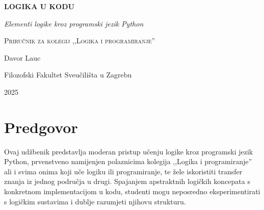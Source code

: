 \documentclass[11pt,a4paper,twoside,openright]{book}
\theoremstyle{definition}
\theoremstyle{plain}
\theoremstyle{remark}
\begin{document}
\frontmatter

\begin{titlepage}
    \centering
    \vspace*{2cm}
    
    {\Huge\bfseries\color{pythonblue} LOGIKA U KODU\par}
    \vspace{1cm}
    {\Large\itshape Elementi logike kroz programski jezik Python\par}
    
    \vspace{3cm}
    
    
    \vspace{3cm}
    
    {\large\scshape Priručnik za kolegij ,,Logika i programiranje''\par}
    \vspace{1cm}
    {\large Davor Lauc\par}
    
    \vfill
    
    {\large Filozofski Fakultet Sveučilišta u Zagrebu\par}
    {\large 2025\par}
\end{titlepage}

\tableofcontents

\chapter*{Predgovor}

Ovaj udžbenik predstavlja moderan pristup učenju logike kroz programski jezik Python, prvenstveno namijenjen polaznicima kolegija ,,Logika i programiranje'' ali i svima onima koji uče logiku ili programiranje, te žele iskoristiti transfer znanja iz jednog područja u drugi.
Spajanjem apstraktnih logičkih koncepata s konkretnom implementacijom u kodu, studenti mogu neposredno eksperimentirati s logičkim sustavima i dublje razumjeti njihovu strukturu.
\end{document}
